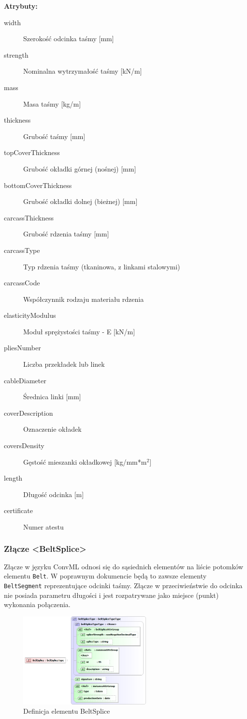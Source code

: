 \documentclass[12pt,a4paper]{article}
\begin{document}
\noindent\textbf{Atrybuty:}
\begin{description}
\item[width] Szerokość odcinka taśmy [mm]
\item[strength] Nominalna wytrzymałość taśmy [kN/m]
\item[mass] Masa taśmy [kg/m]
\item[thickness] Grubość taśmy [mm]
\item[topCoverThickness] Grubość okładki górnej (nośnej) [mm]
\item[bottomCoverThickness] Grubość okładki dolnej (bieżnej) [mm]
\item[carcassThickness] Grubość rdzenia taśmy [mm]
\item[carcassType] Typ rdzenia taśmy (tkaninowa, z linkami stalowymi)
\item[carcassCode] Współczynnik rodzaju materiału rdzenia
\item[elasticityModulus] Moduł sprężystości taśmy - E [kN/m]
\item[pliesNumber] Liczba przekładek lub linek
\item[cableDiameter] Średnica linki [mm]
\item[coverDescription] Oznaczenie okładek
\item[coversDensity] Gęstość mieszanki okładkowej [kg/mm*m$^2$]
\item[length] Długość odcinka [m]
\item[certificate] Numer atestu
\end{description}


\subsubsection{Złącze <BeltSplice>}
Złącze w języku ConvML odnosi się do sąsiednich elementów na liście potomków
elementu {\tt Belt}.  W poprawnym dokumencie będą to zawsze elementy {\tt
  BeltSegment} reprezentujące odcinki taśmy.  Złącze w przeciwieństwie do
odcinka nie posiada parametru długości i jest rozpatrywane jako miejsce (punkt)
wykonania połączenia.

\begin{figure}[H]
  \centering
  \includegraphics[width=0.6\textwidth]{png/liquid/BeltSplice}
  \caption{Definicja elementu BeltSplice}
  \label{fig:beltSplice-xsd}
\end{figure}
\end{document}
